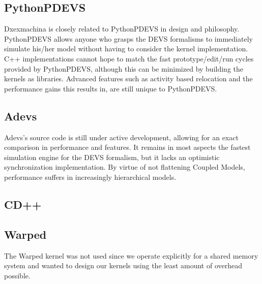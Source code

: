 \subsection{PythonPDEVS}
Dxexmachina is closely related to PythonPDEVS in design and philosophy. PythonPDEVS allows anyone who grasps the DEVS formalisms to immediately simulate his/her model without having to consider the kernel implementation. C++ implementations cannot hope to match the fast prototype/edit/run cycles provided by PythonPDEVS, although this can be minimized by building the kernels as libraries. %
Advanced features such as activity based relocation and the performance gains this results in, are still unique to PythonPDEVS. \\
\subsection{Adevs}
Adevs's source code is still under active development, allowing for an exact comparison in performance and features. It remains in most aspects the fastest simulation engine for the DEVS formalism, but it lacks an optimistic synchronization implementation. %
By virtue of not flattening Coupled Models, performance suffers in increasingly hierarchical models.
\subsection{CD++}
\subsection{Warped}
The Warped kernel was not used since we operate explicitly for a shared memory system and wanted to design our kernels using the least amount of overhead possible.
